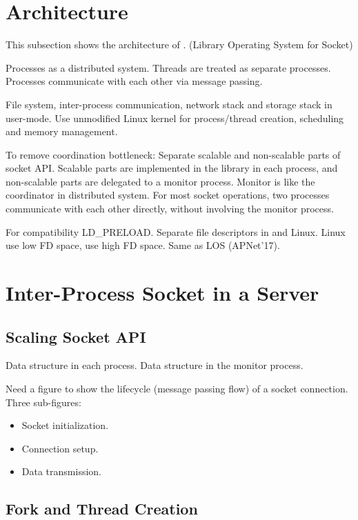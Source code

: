\section{Architecture}
\label{sec:design}

This subsection shows the architecture of \sys. (Library Operating System for Socket)

Processes as a distributed system.
Threads are treated as separate processes.
Processes communicate with each other via message passing.

File system, inter-process communication, network stack and storage stack in user-mode.
Use unmodified Linux kernel for process/thread creation, scheduling and memory management.

To remove coordination bottleneck:
Separate scalable and non-scalable parts of socket API.
Scalable parts are implemented in the library in each process, and non-scalable parts are delegated to a monitor process.
Monitor is like the coordinator in distributed system.
For most socket operations, two processes communicate with each other directly, without involving the monitor process.


For compatibility
LD\_PRELOAD.
Separate file descriptors in \sys and Linux. Linux use low FD space, \sys use high FD space. Same as LOS (APNet'17).

\section{Inter-Process Socket in a Server}
\label{sec:intra-server}

\subsection{Scaling Socket API}

Data structure in each process. Data structure in the monitor process.

Need a figure to show the lifecycle (message passing flow) of a socket connection. Three sub-figures:

\begin{itemize}
	\item Socket initialization.
	\item Connection setup.
	\item Data transmission.
\end{itemize}


\subsection{Fork and Thread Creation}

